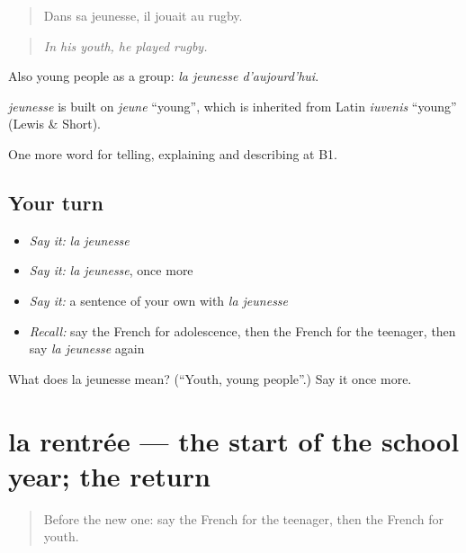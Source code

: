 \begin{quote}
Dans sa jeunesse, il jouait au rugby.
\end{quote}

\begin{quote}
\emph{In his youth, he played rugby.}
\end{quote}

Also young people as a group: \emph{la jeunesse d'aujourd'hui}.

\begin{cousinweb}
\emph{jeunesse} is built on \emph{jeune} \textquotedblleft{}young\textquotedblright{}, which is inherited from Latin \emph{iuvenis} \textquotedblleft{}young\textquotedblright{} (Lewis \& Short).
\end{cousinweb}

\begin{grammarlens}[title={What you've built}]
One more word for telling, explaining and describing at B1.
\end{grammarlens}

\subsection*{Your turn}
\begin{itemize}
\raggedright
  \item \emph{Say it:} \emph{la jeunesse}
  \item \emph{Say it:} \emph{la jeunesse}, once more
  \item \emph{Say it:} a sentence of your own with \emph{la jeunesse}
  \item \emph{Recall:} say the French for adolescence, then the French for the teenager, then say \emph{la jeunesse} again
\end{itemize}

\begin{tcolorbox}[breakable,colback=teal!4,colframe=teal!35!black,title={Before you move on}]
What does la jeunesse mean? (\textquotedblleft{}Youth, young people\textquotedblright{}.) Say it once more.
\end{tcolorbox}
\section[la rentrée]{la rentrée — the start of the school year; the return}

\label{lesson:FR-C310-rentree}



\begin{quote}
Before the new one: say the French for the teenager, then the French for youth.
\end{quote}

